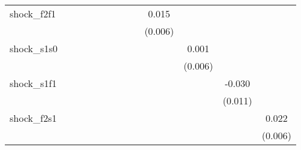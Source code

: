 {\begin{tabular}{l*{12}{c}}
\addlinespace
shock\_f2f1  &                     &                     &                     &                     &                     &                     &                     &                     &       0.015\sym{**} &                     &                     &                     \\
            &                     &                     &                     &                     &                     &                     &                     &                     &     (0.006)         &                     &                     &                     \\
\addlinespace
shock\_s1s0  &                     &                     &                     &                     &                     &                     &                     &                     &                     &       0.001         &                     &                     \\
            &                     &                     &                     &                     &                     &                     &                     &                     &                     &     (0.006)         &                     &                     \\
\addlinespace
shock\_s1f1  &                     &                     &                     &                     &                     &                     &                     &                     &                     &                     &      -0.030\sym{**} &                     \\
            &                     &                     &                     &                     &                     &                     &                     &                     &                     &                     &     (0.011)         &                     \\
\addlinespace
shock\_f2s1  &                     &                     &                     &                     &                     &                     &                     &                     &                     &                     &                     &       0.022\sym{***}\\
            &                     &                     &                     &                     &                     &                     &                     &                     &                     &                     &                     &     (0.006)         \\

\end{tabular}}
